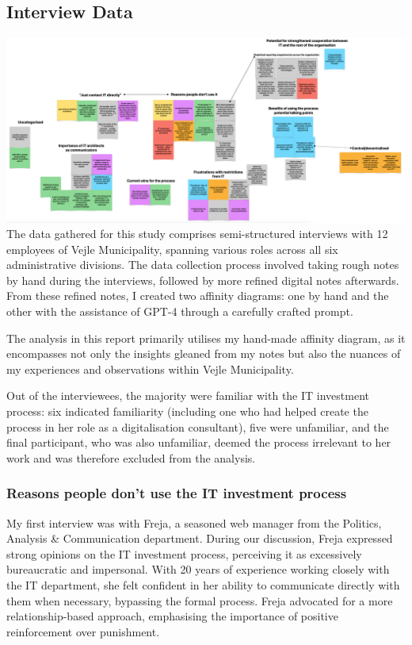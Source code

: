 \documentclass[
]{book}
\begin{document}
\hypertarget{interview-data}{%
\subsection{Interview Data}\label{interview-data}}

\hfill\break
\includegraphics{9d6d3fd1cf5e3b0a9a7514c1b7c47822.png} The data gathered for this study comprises semi-structured interviews with 12 employees of Vejle Municipality, spanning various roles across all six administrative divisions. The data collection process involved taking rough notes by hand during the interviews, followed by more refined digital notes afterwards. From these refined notes, I created two affinity diagrams: one by hand and the other with the assistance of GPT-4 through a carefully crafted prompt.

The analysis in this report primarily utilises my hand-made affinity diagram, as it encompasses not only the insights gleaned from my notes but also the nuances of my experiences and observations within Vejle Municipality.

Out of the interviewees, the majority were familiar with the IT investment process: six indicated familiarity (including one who had helped create the process in her role as a digitalisation consultant), five were unfamiliar, and the final participant, who was also unfamiliar, deemed the process irrelevant to her work and was therefore excluded from the analysis.

\hypertarget{reasons-people-dont-use-the-it-investment-process}{%
\subsubsection{Reasons people don't use the IT investment process}\label{reasons-people-dont-use-the-it-investment-process}}

My first interview was with Freja, a seasoned web manager from the Politics, Analysis \& Communication department. During our discussion, Freja expressed strong opinions on the IT investment process, perceiving it as excessively bureaucratic and impersonal. With 20 years of experience working closely with the IT department, she felt confident in her ability to communicate directly with them when necessary, bypassing the formal process. Freja advocated for a more relationship-based approach, emphasising the importance of positive reinforcement over punishment.
\end{document}
